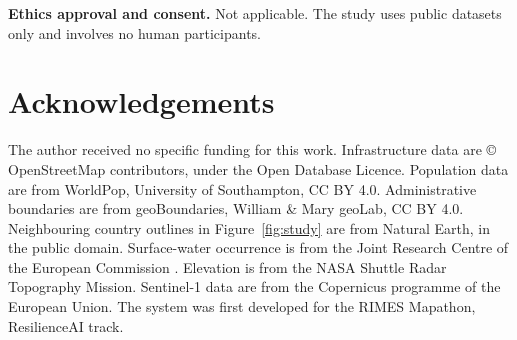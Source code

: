 \documentclass[10pt,a4paper,twocolumn]{article}
\begin{document}
\textbf{Ethics approval and consent.} Not applicable. The study uses public datasets only and involves no human participants.

\section*{Acknowledgements}

The author received no specific funding for this work. Infrastructure data are \copyright{} OpenStreetMap contributors, under the Open Database Licence. Population data are from WorldPop, University of Southampton, CC BY 4.0. Administrative boundaries are from geoBoundaries, William \& Mary geoLab, CC BY 4.0. Neighbouring country outlines in Figure~\ref{fig:study} are from Natural Earth, in the public domain. Surface-water occurrence is from the Joint Research Centre of the European Commission \citep{pekel2016}. Elevation is from the NASA Shuttle Radar Topography Mission. Sentinel-1 data are from the Copernicus programme of the European Union. The system was first developed for the RIMES Mapathon, ResilienceAI track.



\end{document}
